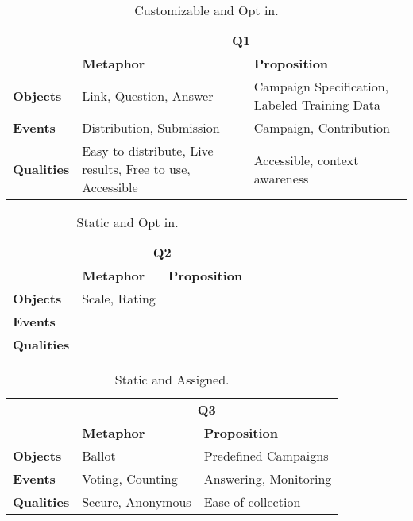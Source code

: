 
\begin{table}[!htbp]
\centering
\begin{tabularx}{\textwidth}{X|X|X|}
\cline{2-3}
                                         & \multicolumn{2}{c|}{\textbf{Q1}}            \\ \cline{2-3}  
                                         & \textbf{Metaphor}                                     & \textbf{Proposition}    \\ \hline
\multicolumn{1}{|l|}{\textbf{Objects}}   & Link, Question, Answer                                & Campaign Specification, Labeled Training Data \\ \hline
\multicolumn{1}{|l|}{\textbf{Events}}    & Distribution, Submission                              & Campaign, Contribution         \\ \hline
\multicolumn{1}{|l|}{\textbf{Qualities}} & Easy to distribute, Live results, Free to use, Accessible & Accessible, context awareness  \\ \hline
\end{tabularx}
\caption{Customizable and Opt in.}
\end{table}
\FloatBarrier

\begin{table}[!htbp]
\centering
\begin{tabular}{l|l|l|}
\cline{2-3}
                                         & \multicolumn{2}{c|}{\textbf{Q2}}         \\ \cline{2-3} 
                                         & \textbf{Metaphor} & \textbf{Proposition} \\ \hline
\multicolumn{1}{|l|}{\textbf{Objects}}   & Scale, Rating     &                      \\ \hline
\multicolumn{1}{|l|}{\textbf{Events}}    &                   &                      \\ \hline
\multicolumn{1}{|l|}{\textbf{Qualities}} &                   &                      \\ \hline
\end{tabular}
\caption{Static and Opt in.}
\end{table}
\FloatBarrier

\begin{table}[!htbp]
\centering
\begin{tabular}{l|l|l|}
\cline{2-3}
                                         & \multicolumn{2}{c|}{\textbf{Q3}}         \\ \cline{2-3} 
                                         & \textbf{Metaphor} & \textbf{Proposition}  \\ \hline
\multicolumn{1}{|l|}{\textbf{Objects}}   & Ballot            & Predefined Campaigns  \\ \hline
\multicolumn{1}{|l|}{\textbf{Events}}    & Voting, Counting  & Answering, Monitoring \\ \hline
\multicolumn{1}{|l|}{\textbf{Qualities}} & Secure, Anonymous & Ease of collection    \\ \hline
\end{tabular}
\caption{Static and Assigned.}
\end{table}
\FloatBarrier

